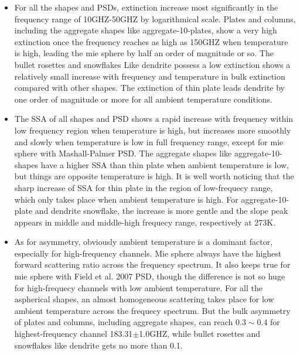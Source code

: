 \begin{itemize}
    \item {} 
    
    For all the shapes and PSDs, extinction increase most significantly in the frequency range of 10GHZ-50GHZ by logarithmical scale.
    Plates and columns, including the aggregate shapes like aggregate-10-plates, show a very high extinction once the frequency reaches as high
    as 150GHZ when temperature is high, leading the mie sphere by half an order of magnitude or so. The bullet rosettes and snowflakes Like
    dendrite possess a low extinction shows a relatively small increase with frequency and temperature in bulk extinction compared with other shapes.
    The extinction of thin plate leads dendrite by one order of magnitude or more for all ambient temperature conditions.  

    \item {}
     
    The SSA of all shapes and PSD shows a rapid increase with frequency within low frequency region when temperature is high, 
    but increases more smoothly and slowly when temperature is low in full frequency range, except for mie sphere with Mashall-Palmer PSD. 
    The aggregate shapes like aggregate-10-shapes have a higher SSA than thin plate when ambient temperature is low, but things are opposite temperature is high.
    It is well worth noticing that the sharp increase of SSA for thin plate in the region of low-frequecy range, which only takes place when ambient temperature is high.
    For aggregate-10-plate and dendrite snowflake, the increase is more gentle and the slope peak appears in middle and middle-high frequecy range, respectively at 273K.  
    
    \item {}
    
    As for asymmetry, obviously ambient temperature is a dominant factor, especially for high-frequency channels. Mie sphere always have the highest forward scattering ratio
    across the frequency spectrum. It also keeps true for mie sphere with Field et al. 2007 PSD, though the difference is not so huge for high-frequecy channels with low ambient
    temperature. For all the aspherical shapes, an almost homogeneous scattering takes place for low ambient temperature across the frequecy spectrum. But the bulk asymmetry
    of plates and columns, including aggregate shapes, can reach $0.3 \sim 0.4$ for highest-frequency channel 183.31$\pm$1.0GHZ, while bullet rosettes and snowflakes like dendrite
    gets no more than 0.1.
    
\end{itemize}


